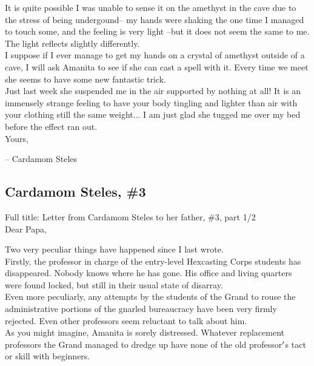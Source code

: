 \documentclass[12pt]{article}
\begin{document}
  
    It is quite possible I was unable to sense it on the amethyst in the cave due to the stress of being undergound-- my hands were shaking the one time I managed to touch some, and the feeling is very light --but it does not seem the same to me. The light reflects slightly differently.\\I suppose if I ever manage to get my hands on a crystal of amethyst outside of a cave, I will ask Amanita to see if she can cast a spell with it. Every time we meet she seems to have some new fantastic trick.\\


  
    Just last week she suspended me in the air supported by nothing at all! It is an immensely strange feeling to have your body tingling and lighter than air with your clothing still the same weight... I am just glad she tugged me over my bed before the effect ran out.\\Yours,

-- Cardamom Steles\\

\newpage

\label{sec:lore/cardamom3}
\subsection*{Cardamom Steles, \#3}


  
    Full title: Letter from Cardamom Steles to her father, \#3, part 1/2\\Dear Papa,

Two very peculiar things have happened since I last wrote.\\Firstly, the professor in charge of the entry-level Hexcasting Corps students has disappeared. Nobody knows where he has gone. His office and living quarters were found locked, but still in their usual state of disarray.\\


  
    Even more peculiarly, any attempts by the students of the Grand to rouse the administrative portions of the gnarled bureaucracy have been very firmly rejected. Even other professors seem reluctant to talk about him.\\As you might imagine, Amanita is sorely distressed. Whatever replacement professors the Grand managed to dredge up have none of the old professor$\rq$s tact or skill with beginners.\\
\end{document}
